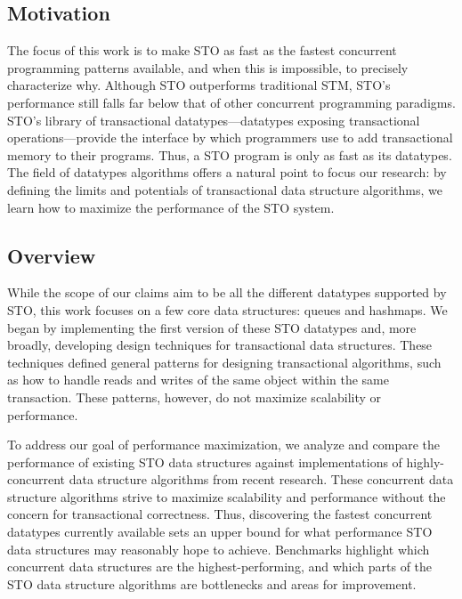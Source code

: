 \subsection{Motivation}
The focus of this work is to make STO as fast as the fastest concurrent programming patterns available, and when this is impossible, to precisely characterize why. Although STO outperforms traditional STM, STO’s performance still falls far below that of other concurrent programming paradigms. STO’s library of transactional datatypes---datatypes exposing transactional operations---provide the interface by which programmers use to add transactional memory to their programs. Thus, a STO program is only as fast as its datatypes. The field of datatypes algorithms offers a natural point to focus our research: by defining the limits and potentials of transactional data structure algorithms, we learn how to maximize the performance of the STO system.

\subsection{Overview}
While the scope of our claims aim to be all the different datatypes supported by STO, this work focuses on a few core data structures: queues and hashmaps. We began by implementing the first version of these STO datatypes and, more broadly, developing design techniques for transactional data structures. These techniques defined general patterns for designing transactional algorithms, such as how to handle reads and writes of the same object within the same transaction. These patterns, however, do not maximize scalability or performance.

To address our goal of performance maximization, we analyze and compare the performance of existing STO data structures against implementations of highly-concurrent data structure algorithms from recent research. These concurrent data structure algorithms strive to maximize scalability and performance without the concern for transactional correctness. Thus, discovering the fastest concurrent datatypes currently available sets an upper bound for what performance STO data structures may reasonably hope to achieve. Benchmarks highlight which concurrent data structures are the highest-performing, and which parts of the STO data structure algorithms are bottlenecks and areas for improvement. 

